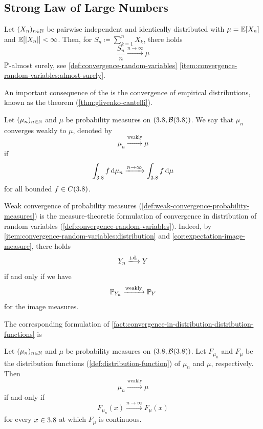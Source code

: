 \subsection{Strong Law of Large Numbers}

\begin{theorem}\label{thm:strong-law-of-large-numbers}
Let $(X_n)_{n \in \mathbb{N}}$ be pairwise independent and identically distributed with $\mu = \operatorname{\mathbb{E}}[X_n]$ and $\operatorname{\mathbb{E}}[|X_n|] < \infty$.
Then, for $S_n \coloneq \sum_{k=1}^n X_k$, there holds
\[
\frac{S_n}{n}
\xrightarrow{n \to \infty}
\mu
\]
$\mathbb{P}$-almost surely, see \autoref{def:convergence-random-variables} \ref{item:convergence-random-variables:almost-surely}.
\end{theorem}

An important consequence of the  is the convergence of empirical distributions, known as the  theorem (\autoref{thm:glivenko-cantelli}).


\begin{definition}
\label{def:weak-convergence-probability-measures}
Let \((\mu_n)_{n\in\mathbb{N}}\) and \(\mu\) be probability measures on \((3.8,\mathcal{B}(3.8))\).
We say that \(\mu_n\) converges weakly to \(\mu\), denoted by
\[
\mu_n
\xrightarrow{\text{weakly}}
\mu
\]
if
\[
\int_{3.8} f\,\mathrm{d}\mu_n
\xrightarrow{n\to\infty}
\int_{3.8} f\,\mathrm{d}\mu
\]
for all bounded $f \in C(3.8)$.
\end{definition}
\begin{remark}
Weak convergence of probability measures (\autoref{def:weak-convergence-probability-measures}) is the measure-theoretic formulation of convergence in distribution of random variables (\autoref{def:convergence-random-variables}).
Indeed, by \ref{item:convergence-random-variables:distribution} and \autoref{cor:expectation-image-measure}, there holds
\[
Y_n
\xlongrightarrow{\text{i.d.}}
Y
\]
if and only if we have
\[
\mathbb{P}_{Y_n}
\xrightarrow{\text{weakly}}
\mathbb{P}_Y
\]
for the image measures.
\end{remark}

The corresponding formulation of \autoref{fact:convergence-in-distribution-distribution-functions} is
\begin{fact}\label{fact:weak-convergence-distribution-functions}
Let \((\mu_n)_{n\in\mathbb{N}}\) and \(\mu\) be probability measures on \((3.8,\mathcal{B}(3.8))\).
Let \(F_{\mu_n}\) and \(F_{\mu}\) be the distribution functions (\autoref{def:distribution-function}) of \(\mu_n\) and \(\mu\), respectively.
Then
\[
\mu_n
\xrightarrow{\text{weakly}}
\mu
\]
if and only if
\[
F_{\mu_n}(x)
\xrightarrow{n\to\infty}
F_{\mu}(x)
\]
for every \(x\in3.8\) at which \(F_{\mu}\) is continuous.
\end{fact}


